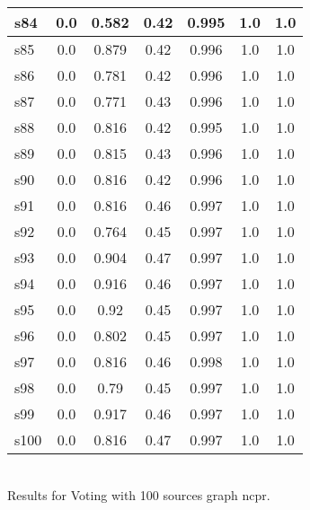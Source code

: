 \documentclass{article}
\begin{document}
\begin{tabular}{|l|c|c|c|c|c|c|}
s84 &0.0 & 0.582 & 0.42 & 0.995 & 1.0 & 1.0\\
\hline
s85 &0.0 & 0.879 & 0.42 & 0.996 & 1.0 & 1.0\\
\hline
s86 &0.0 & 0.781 & 0.42 & 0.996 & 1.0 & 1.0\\
\hline
s87 &0.0 & 0.771 & 0.43 & 0.996 & 1.0 & 1.0\\
\hline
s88 &0.0 & 0.816 & 0.42 & 0.995 & 1.0 & 1.0\\
\hline
s89 &0.0 & 0.815 & 0.43 & 0.996 & 1.0 & 1.0\\
\hline
s90 &0.0 & 0.816 & 0.42 & 0.996 & 1.0 & 1.0\\
\hline
s91 &0.0 & 0.816 & 0.46 & 0.997 & 1.0 & 1.0\\
\hline
s92 &0.0 & 0.764 & 0.45 & 0.997 & 1.0 & 1.0\\
\hline
s93 &0.0 & 0.904 & 0.47 & 0.997 & 1.0 & 1.0\\
\hline
s94 &0.0 & 0.916 & 0.46 & 0.997 & 1.0 & 1.0\\
\hline
s95 &0.0 & 0.92 & 0.45 & 0.997 & 1.0 & 1.0\\
\hline
s96 &0.0 & 0.802 & 0.45 & 0.997 & 1.0 & 1.0\\
\hline
s97 &0.0 & 0.816 & 0.46 & 0.998 & 1.0 & 1.0\\
\hline
s98 &0.0 & 0.79 & 0.45 & 0.997 & 1.0 & 1.0\\
\hline
s99 &0.0 & 0.917 & 0.46 & 0.997 & 1.0 & 1.0\\
\hline
s100 &0.0 & 0.816 & 0.47 & 0.997 & 1.0 & 1.0\\
\hline
\end{tabular}\\

\noindent Results for Voting with 100 sources graph ncpr.
\end{document}
